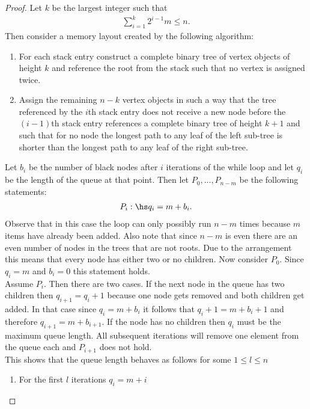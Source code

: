 \documentclass{article}
\begin{document}
\begin{proof}
    Let $k$ be the largest integer such that
    \begin{align*}
        \sum_{i=1}^k 2^{i-1}m \leq n.
    \end{align*}
    Then consider a memory layout created by the following algorithm:
    \begin{enumerate}
        \item For each stack entry construct a complete binary tree of vertex objects
        of height $k$ and reference the root from the stack such that no vertex is assigned twice.
        \item Assign the remaining $n-k$ vertex objects in such a way that the tree referenced by the $i$th
        stack entry does not receive a new node before the $(i-1)$th stack entry references a 
        complete binary tree of height $k+1$
        and such that for no node the longest path to any leaf of the left sub-tree is shorter
        than the longest path to any leaf of the right sub-tree.
    \end{enumerate}
    Let $b_i$ be the number of black nodes after $i$ iterations of the while loop and let
    $q_i$ be the length of the queue at that point. Then let $P_0,...,P_{n-m}$ be the
    following statements:
    \begin{align*}
        P_i:\hs q_i = m+b_i.
    \end{align*}
    Observe that in this case the loop can only possibly run $n-m$ times because $m$ items have
    already been added. Also note that since $n-m$ is even there are an even number of nodes
    in the trees that are not roots. Due to the arrangement this means that every node has either
    two or no children. Now consider $P_0$. Since $q_i=m$ and $b_i=0$ this statement holds.\\
    \indent Assume $P_i$. Then there are two cases. If the next node in the queue has two children
    then $q_{i+1} = q_i+1$ because one node gets removed and both children get added. In that
    case since $q_i = m + b_i$ it follows that $q_i + 1 = m + b_i + 1$ and therefore
    $q_{i+1} = m + b_{i+1}$. If the
    node has no children then $q_i$ must be the maximum queue length. All subsequent iterations
    will remove one element from the queue each and $P_{i+1}$ does not hold.\\
    This shows that the queue length behaves as follows for some $1\leq l \leq n$
    \begin{enumerate}
        \item For the first $l$ iterations $q_i = m + i$

\end{enumerate}
\end{proof}
\end{document}
